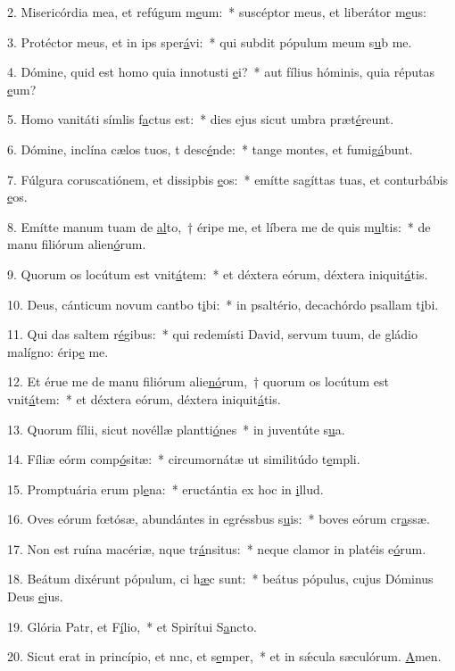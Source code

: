 2. Misericórdia mea, et refúgum m\uline{e}um:~* suscéptor meus, et liberátor m\uline{e}us:\par 
3. Protéctor meus, et in ips sper\uline{á}vi:~* qui subdit pópulum meum s\uline{u}b me.\par 
4. Dómine, quid est homo quia innotusti \uline{e}i?~* aut fílius hóminis, quia réputas \uline{e}um?\par 
5. Homo vanitáti símlis f\uline{a}ctus est:~* dies ejus sicut umbra præt\uline{é}reunt.\par 
6. Dómine, inclína cælos tuos, t desc\uline{é}nde:~* tange montes, et fumig\uline{á}bunt.\par 
7. Fúlgura coruscatiónem, et dissipbis \uline{e}os:~* emítte sagíttas tuas, et conturbábis \uline{e}os.\par 
8. Emítte manum tuam de \uline{al}to,~† éripe me, et líbera me de quis m\uline{u}ltis:~* de manu filiórum alien\uline{ó}rum.\par 
9. Quorum os locútum est vnit\uline{á}tem:~* et déxtera eórum, déxtera iniquit\uline{á}tis.\par 
10. Deus, cánticum novum cantbo t\uline{i}bi:~* in psaltério, decachórdo psallam t\uline{i}bi.\par 
11. Qui das saltem r\uline{é}gibus:~* qui redemísti David, servum tuum, de gládio malígno: érip\uline{e} me.\par 
12. Et érue me de manu filiórum alie\uline{nó}rum,~† quorum os locútum est vnit\uline{á}tem:~* et déxtera eórum, déxtera iniquit\uline{á}tis.\par 
13. Quorum fílii, sicut novéllæ plantti\uline{ó}nes~* in juventúte s\uline{u}a.\par 
14. Fíliæ eórm comp\uline{ó}sitæ:~* circumornátæ ut similitúdo t\uline{e}mpli.\par 
15. Promptuária erum pl\uline{e}na:~* eructántia ex hoc in \uline{i}llud.\par 
16. Oves eórum fœtósæ, abundántes in egréssbus s\uline{u}is:~* boves eórum cr\uline{a}ssæ.\par 
17. Non est ruína macériæ, nque tr\uline{á}nsitus:~* neque clamor in platéis e\uline{ó}rum.\par 
18. Beátum dixérunt pópulum, ci h\uline{æ}c sunt:~* beátus pópulus, cujus Dóminus Deus \uline{e}jus.\par 
19. Glória Patr, et F\uline{í}lio,~* et Spirítui S\uline{a}ncto.\par 
20. Sicut erat in princípio, et nnc, et s\uline{e}mper,~* et in sǽcula sæculórum. \uline{A}men.\par 
